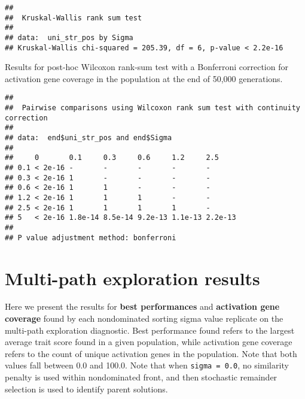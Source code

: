 \documentclass[]{book}
\newenvironment{Shaded}{\begin{snugshade}}{\end{snugshade}}
\newcommand{\DataTypeTok}[1]{\textcolor[rgb]{0.13,0.29,0.53}{#1}}
\newcommand{\KeywordTok}[1]{\textcolor[rgb]{0.13,0.29,0.53}{\textbf{#1}}}
\newcommand{\NormalTok}[1]{#1}
\newcommand{\OperatorTok}[1]{\textcolor[rgb]{0.81,0.36,0.00}{\textbf{#1}}}
\newcommand{\OtherTok}[1]{\textcolor[rgb]{0.56,0.35,0.01}{#1}}
\newcommand{\StringTok}[1]{\textcolor[rgb]{0.31,0.60,0.02}{#1}}
\begin{document}
\begin{verbatim}
## 
##  Kruskal-Wallis rank sum test
## 
## data:  uni_str_pos by Sigma
## Kruskal-Wallis chi-squared = 205.39, df = 6, p-value < 2.2e-16
\end{verbatim}

Results for post-hoc Wilcoxon rank-sum test with a Bonferroni correction for activation gene coverage in the population at the end of 50,000 generations.

\begin{Shaded}
\end{Shaded}

\begin{verbatim}
## 
##  Pairwise comparisons using Wilcoxon rank sum test with continuity correction 
## 
## data:  end$uni_str_pos and end$Sigma 
## 
##     0       0.1     0.3     0.6     1.2     2.5    
## 0.1 < 2e-16 -       -       -       -       -      
## 0.3 < 2e-16 1       -       -       -       -      
## 0.6 < 2e-16 1       1       -       -       -      
## 1.2 < 2e-16 1       1       1       -       -      
## 2.5 < 2e-16 1       1       1       1       -      
## 5   < 2e-16 1.8e-14 8.5e-14 9.2e-13 1.1e-13 2.2e-13
## 
## P value adjustment method: bonferroni
\end{verbatim}

\hypertarget{multi-path-exploration-results-5}{%
\section{Multi-path exploration results}\label{multi-path-exploration-results-5}}

Here we present the results for \textbf{best performances} and \textbf{activation gene coverage} found by each nondominated sorting sigma value replicate on the multi-path exploration diagnostic.
Best performance found refers to the largest average trait score found in a given population, while activation gene coverage refers to the count of unique activation genes in the population.
Note that both values fall between 0.0 and 100.0.
Note that when \texttt{sigma\ =\ 0.0}, no similarity penalty is used within nondominated front, and then stochastic remainder selection is used to identify parent solutions.
\end{document}
